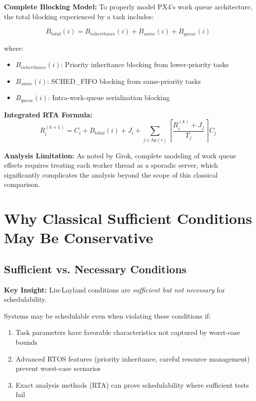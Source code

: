 \documentclass[12pt,a4paper]{article}
\begin{document}
\textbf{Complete Blocking Model:} To properly model PX4's work queue architecture, the total blocking experienced by a task includes:

\begin{equation}
B_{total}(i) = B_{inheritance}(i) + B_{same}(i) + B_{queue}(i)
\end{equation}

where:
\begin{itemize}
\item $B_{inheritance}(i)$: Priority inheritance blocking from lower-priority tasks
\item $B_{same}(i)$: SCHED\_FIFO blocking from same-priority tasks
\item $B_{queue}(i)$: Intra-work-queue serialization blocking
\end{itemize}

\textbf{Integrated RTA Formula:}
\begin{equation}
R_i^{(k+1)} = C_i + B_{total}(i) + J_i + \sum_{j \in hp(i)} \left\lceil \frac{R_i^{(k)} + J_j}{T_j} \right\rceil C_j
\end{equation}

\textbf{Analysis Limitation:} As noted by Grok, complete modeling of work queue effects requires treating each worker thread as a sporadic server, which significantly complicates the analysis beyond the scope of this classical comparison.

\section{Why Classical Sufficient Conditions May Be Conservative}

\subsection{Sufficient vs. Necessary Conditions}

\textbf{Key Insight:} Liu-Layland conditions are \emph{sufficient but not necessary} for schedulability.

Systems may be schedulable even when violating these conditions if:
\begin{enumerate}
\item Task parameters have favorable characteristics not captured by worst-case bounds
\item Advanced RTOS features (priority inheritance, careful resource management) prevent worst-case scenarios
\item Exact analysis methods (RTA) can prove schedulability where sufficient tests fail
\end{enumerate}
\end{document}
